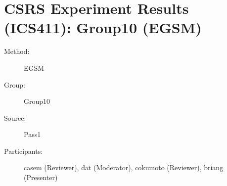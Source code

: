 \chapter {CSRS Experiment Results (ICS411): Group10 (EGSM)}
\small
	  

\begin{description}
\item [Method:] EGSM
\item [Group:] Group10
\item [Source:] Pass1
\item [Participants:] casem (Reviewer), dat (Moderator), cokumoto (Reviewer), briang (Presenter)
\end{description}

